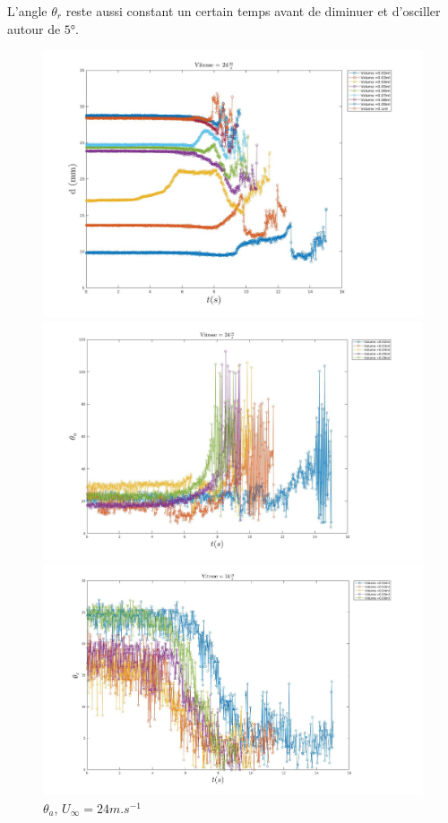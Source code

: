 L'angle $\theta_{r}$ reste aussi constant un certain temps avant de diminuer et d'osciller autour de $\ang{5}$.
\begin{figure}[!h]
	\begin{minipage}{0.8\linewidth}
	\includegraphics[width = \linewidth]{./image/v=24d.jpg}
	\caption{$d$, $U_{\infty}=24m.s^{-1}$}
		\label{fig:v=24d}
	\end{minipage}
	\begin{minipage}{0.8\linewidth}
	\includegraphics[width = \linewidth]{./image/v=24oa_2.jpg}
	\caption{$\theta_{a}$, $U_{\infty}=24m.s^{-1}$}
		\label{fig:v=24oa_2}
	\end{minipage}
	\begin{minipage}{0.8\linewidth}
	\includegraphics[width = \linewidth]{./image/v=24or_2.jpg}

\end{minipage}
\end{figure}
